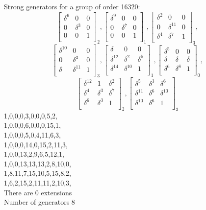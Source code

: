 {\small\arraycolsep=2pt
Strong generators for a group of order 16320:
$$
\left[
\begin{array}{*{3}{r}}
\delta^{6} & 0 & 0\\
0 & \delta^{3} & 0\\
0 & 0 & 1\\
\end{array}
\right]
_{2}
,
\left[
\begin{array}{*{3}{r}}
\delta^{9} & 0 & 0\\
0 & \delta^{7} & 0\\
0 & 0 & 1\\
\end{array}
\right]
_{1}
,
\left[
\begin{array}{*{3}{r}}
\delta^{2} & 0 & 0\\
0 & \delta^{11} & 0\\
\delta^{4} & \delta^{7} & 1\\
\end{array}
\right]
_{3}
,
$$
$$
\left[
\begin{array}{*{3}{r}}
\delta^{10} & 0 & 0\\
0 & \delta^{3} & 0\\
\delta  & \delta^{11} & 1\\
\end{array}
\right]
_{3}
,
\left[
\begin{array}{*{3}{r}}
\delta  & 0 & 0\\
\delta^{12} & \delta^{2} & \delta^{5}\\
\delta^{14} & \delta^{10} & 1\\
\end{array}
\right]
_{1}
,
\left[
\begin{array}{*{3}{r}}
\delta^{5} & 0 & 0\\
\delta  & \delta  & \delta \\
\delta^{6} & \delta^{8} & 1\\
\end{array}
\right]
_{0}
,
$$
$$
\left[
\begin{array}{*{3}{r}}
\delta^{12} & 1 & \delta^{2}\\
\delta^{4} & \delta^{3} & \delta^{7}\\
\delta^{6} & \delta^{3} & 1\\
\end{array}
\right]
_{2}
,
\left[
\begin{array}{*{3}{r}}
\delta^{5} & \delta^{3} & \delta^{6}\\
\delta^{11} & \delta^{6} & \delta^{10}\\
\delta^{10} & \delta^{6} & 1\\
\end{array}
\right]
_{3}
$$
1,0,0,0,3,0,0,0,5,2,\\
1,0,0,0,6,0,0,0,15,1,\\
1,0,0,0,5,0,4,11,6,3,\\
1,0,0,0,14,0,15,2,11,3,\\
1,0,0,13,2,9,6,5,12,1,\\
1,0,0,13,13,13,2,8,10,0,\\
1,8,11,7,15,10,5,15,8,2,\\
1,6,2,15,2,11,11,2,10,3,\\
}
There are 0 extensions\\
Number of generators 8\\
